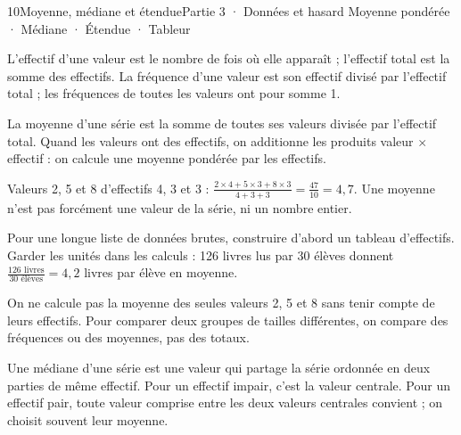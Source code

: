 \begin{ouverture}[statistiques]{10}{Moyenne, médiane et étendue}{Partie 3 · Données et hasard}
{Moyenne pondérée · Médiane · Étendue · Tableur}
\end{ouverture}
\pagestyle{otMain}\essentiel\fontsize{11}{15}\selectfont
{}\label{cours-10-1}
\begin{definition}L’effectif d’une valeur est le nombre de fois où elle apparaît ; l’effectif total est la somme des effectifs. La fréquence d’une valeur est son effectif divisé par l’effectif total ; les fréquences de toutes les valeurs ont pour somme 1.\end{definition}
\begin{propriete}La moyenne d’une série est la somme de toutes ses valeurs divisée par l’effectif total. Quand les valeurs ont des effectifs, on additionne les produits valeur $\times$ effectif : on calcule une moyenne pondérée par les effectifs.\end{propriete}
\begin{exemple}Valeurs 2, 5 et 8 d’effectifs 4, 3 et 3 : $\frac{2\times4+5\times3+8\times3}{4+3+3}=\frac{47}{10}=4{,}7$. Une moyenne n’est pas forcément une valeur de la série, ni un nombre entier.\end{exemple}
\begin{savoirfaire}Pour une longue liste de données brutes, construire d’abord un tableau d’effectifs. Garder les unités dans les calculs : 126 livres lus par 30 élèves donnent $\frac{126\text{ livres}}{30\text{ élèves}}=4{,}2$ livres par élève en moyenne.\end{savoirfaire}
\begin{attention}On ne calcule pas la moyenne des seules valeurs 2, 5 et 8 sans tenir compte de leurs effectifs. Pour comparer deux groupes de tailles différentes, on compare des fréquences ou des moyennes, pas des totaux.\end{attention}
\clearpage
{}\label{cours-10-2}
\begin{definition}Une médiane d’une série est une valeur qui partage la série ordonnée en deux parties de même effectif. Pour un effectif impair, c’est la valeur centrale. Pour un effectif pair, toute valeur comprise entre les deux valeurs centrales convient ; on choisit souvent leur moyenne.\end{definition}
